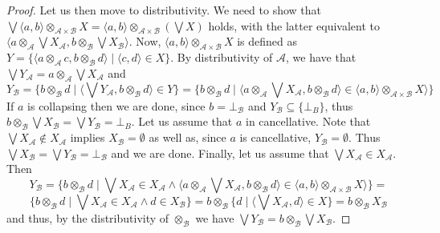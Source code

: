 \documentclass[a4paper]{elsarticle}
\newcommand{\1}{\mathbf{1}}
\begin{document}
\begin{proof}
	Let us then move to distributivity. We need to show that
	$\bigvee \langle a, b\rangle \otimes_{\mathcal{A} \times \mathcal{B}} X = \langle a, b\rangle \otimes_{\mathcal{A} \times \mathcal{B}}  (\bigvee X)$ holds,
	with the latter equivalent to $\langle a \otimes_\mathcal{A} \bigvee X_\mathcal{A}, b \otimes_\mathcal{B} \bigvee X_\mathcal{B} \rangle$.
	Now, $\langle a, b\rangle \otimes_{\mathcal{A} \times \mathcal{B}} X$ is defined as 
	$Y = \{\langle a \otimes_\mathcal{A}  c,  b \otimes_\mathcal{B}  d \rangle \mid \langle c, d \rangle \in X\}$.
	By distributivity of $\mathcal{A}$, we have that $\bigvee Y_\mathcal{A} = a \otimes_\mathcal{A} \bigvee X_\mathcal{A}$ and
	\small
	$$Y_\mathcal{B} = \{ b \otimes_\mathcal{B} d \mid \langle \bigvee Y_\mathcal{A}, b \otimes_\mathcal{B} d \rangle \in Y\}
	= \{ b \otimes_\mathcal{B} d \mid \langle a \otimes_\mathcal{A} \bigvee X_\mathcal{A}, b \otimes_\mathcal{B} d \rangle \in \langle a, b\rangle \otimes_{\mathcal{A} \times \mathcal{B}} X \rangle \}$$
	\normalsize
	If $a$ is collapsing then we are done, since $b = \bot_\mathcal{B}$ and $Y_\mathcal{B} \subseteq \{\bot_{B}\}$,
	thus $b \otimes_\mathcal{B} \bigvee X_\mathcal{B} = 
	\bigvee Y_\mathcal{B} = \bot_{B}$.
	Let us assume that $a$ in cancellative.
	Note that $\bigvee X_\mathcal{A} \not \in X_\mathcal{A}$ implies $X_\mathcal{B} = \emptyset$ as well as, since $a$ is cancellative, $Y_\mathcal{B} = \emptyset$.
	Thus $\bigvee X_\mathcal{B} = \bigvee Y_\mathcal{B} =\bot_\mathcal{B}$ and we are done.
	Finally, let us assume that $\bigvee X_\mathcal{A} \in X_\mathcal{A}$. Then
	$$Y_\mathcal{B} = \{ b \otimes_\mathcal{B}   d \mid \bigvee X_\mathcal{A} \in X_\mathcal{A} \wedge 
	      \langle a \otimes_\mathcal{A} \bigvee X_\mathcal{A}, b  \otimes_\mathcal{B} d \rangle \in \langle a, b\rangle \otimes_{\mathcal{A} \times \mathcal{B}} X \rangle \} =$$
	$$\{ b \otimes_\mathcal{B} d \mid  \bigvee X_\mathcal{A} \in X_\mathcal{A}  \wedge d \in X_\mathcal{B}\} =
	    b \otimes_\mathcal{B} \{ d \mid \langle \bigvee X_\mathcal{A}, d \rangle \in X \} = b \otimes_\mathcal{B} X_\mathcal{B}$$
	\noindent
	and thus, by the distributivity of $\otimes_\mathcal{B}$ we have $\bigvee Y_\mathcal{B} = b \otimes_\mathcal{B} \bigvee X_\mathcal{B}$.
\end{proof}
\end{document}

